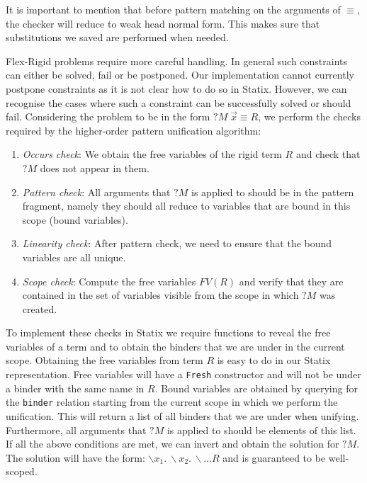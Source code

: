 It is important to mention that before pattern matching on the arguments of $\equiv$, the checker will reduce to weak head normal form. This makes sure that substitutions we saved are performed when needed. \par
Flex-Rigid problems require more careful handling. In general such constraints can either be solved, fail or be postponed. Our implementation cannot currently postpone constraints as it is not clear how to do so in Statix. However, we can recognise the cases where such a constraint can be successfully solved or should fail. Considering the problem to be in the form $?M\;\vec{x} \equiv R$, we perform the checks required by the higher-order pattern unification algorithm:
\begin{enumerate}
  \item \emph{Occurs check}: We obtain the free variables of the rigid term $R$ and check that $?M$ does not appear in them.
  \item \emph{Pattern check}: All arguments that $?M$ is applied to should be in the pattern fragment, namely they should all reduce to variables that are bound in this scope (bound variables).
  \item \emph{Linearity check}: After pattern check, we need to ensure that the bound variables are all unique.
  \item \emph{Scope check}:
    Compute the free variables \(FV(R)\) and verify that they are contained in
    the set of variables visible from the scope in which \(?M\) was created.
   
\end{enumerate}

To implement these checks in Statix we require functions to reveal the free variables of a term and to obtain the binders that we are under in the current scope. Obtaining the free variables from term $R$ is easy to do in our Statix representation. Free variables will have a \texttt{Fresh} constructor and will not be under a binder with the same name in $R$. Bound variables are obtained by querying for the \texttt{binder} relation starting from the current scope in which we perform the unification. This will return a list of all binders that we are under when unifying. Furthermore, all arguments that $?M$ is applied to should be elements of this list. If all the above conditions are met, we can invert and obtain the solution for $?M$. The solution will have the form: $\backslash x_1.\ \backslash x_2.\ \backslash \dots R$ and is guaranteed to be well-scoped. \par

